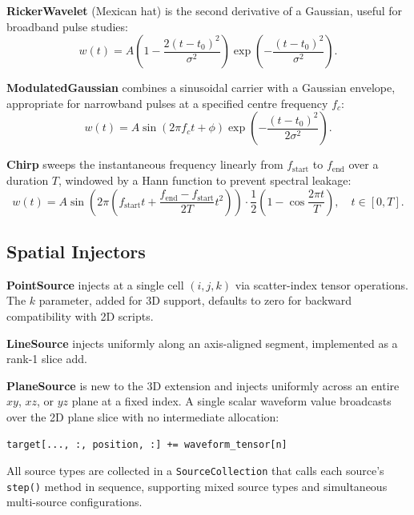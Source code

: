 \documentclass[10pt,twocolumn]{article}
\begin{document}
\textbf{RickerWavelet} (Mexican hat) is the second derivative of a Gaussian,
useful for broadband pulse studies:
\begin{equation}
  w(t) = A \left(1 - \frac{2(t-t_0)^2}{\sigma^2}\right)
           \exp\!\left(-\frac{(t-t_0)^2}{\sigma^2}\right).
\end{equation}

\textbf{ModulatedGaussian} combines a sinusoidal carrier with a Gaussian
envelope, appropriate for narrowband pulses at a specified centre frequency
$f_c$:
\begin{equation}
  w(t) = A \sin(2\pi f_c t + \phi)
           \exp\!\left(-\frac{(t-t_0)^2}{2\sigma^2}\right).
\end{equation}

\textbf{Chirp} sweeps the instantaneous frequency linearly from $f_\text{start}$
to $f_\text{end}$ over a duration $T$, windowed by a Hann function to prevent
spectral leakage:
\begin{equation}
  w(t) = A \sin\!\left(2\pi\left(f_\text{start} t + \frac{f_\text{end}-f_\text{start}}{2T}t^2\right)\right)
  \cdot \frac{1}{2}\left(1 - \cos\frac{2\pi t}{T}\right),
  \quad t \in [0, T].
\end{equation}

\subsection{Spatial Injectors}

\textbf{PointSource} injects at a single cell $(i, j, k)$ via scatter-index
tensor operations. The $k$ parameter, added for 3D support, defaults to zero
for backward compatibility with 2D scripts.

\textbf{LineSource} injects uniformly along an axis-aligned segment,
implemented as a rank-1 slice add.

\textbf{PlaneSource} is new to the 3D extension and injects uniformly across
an entire $xy$, $xz$, or $yz$ plane at a fixed index. A single scalar
waveform value broadcasts over the 2D plane slice with no intermediate
allocation:

\begin{lstlisting}[caption={PlaneSource injection for an xz-plane}]
target[..., :, position, :] += waveform_tensor[n]
\end{lstlisting}

All source types are collected in a \texttt{SourceCollection} that calls
each source's \texttt{step()} method in sequence, supporting mixed source
types and simultaneous multi-source configurations.
\end{document}

